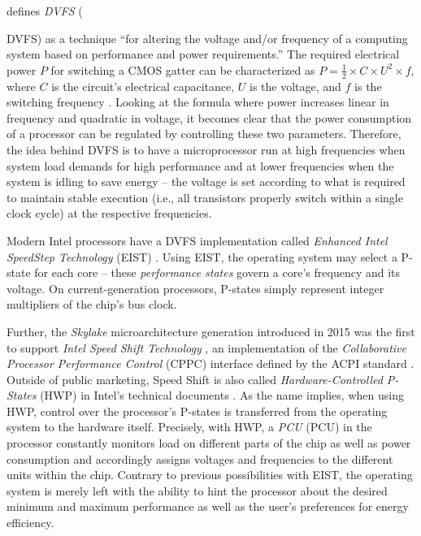 \citeauthor{mittal2014survey} \cite{mittal2014survey} defines \textit{\acrlong{DVFS}} ({\acrshort{DVFS}) as a technique \enquote{for altering the voltage and/or frequency of a computing system based on performance and power requirements.} The required electrical power $P$ for switching a \gls{CMOS} gatter can be characterized as $P=\frac{1}{2} \times C \times U^2 \times f$, where $C$ is the circuit's electrical capacitance, $U$ is the voltage, and $f$ is the switching frequency \cite{Hennessy:2017:CAS:3207796}. Looking at the formula where power increases linear in frequency and quadratic in voltage, it becomes clear that the power consumption of a processor can be regulated by controlling these two parameters. Therefore, the idea behind \gls{DVFS} is to have a microprocessor run at high frequencies when system load demands for high performance and at lower frequencies when the system is idling to save energy -- the voltage is set according to what is required to maintain stable execution (i.e., all transistors properly switch within a single clock cycle) at the respective frequencies.

Modern Intel processors have a \gls{DVFS} implementation called \emph{Enhanced Intel SpeedStep Technology} (EIST) \cite{intelsdmsysprogguide}. Using EIST, the operating system may select a \gls{P-state} for each core -- these \emph{performance states} govern a core's frequency and its voltage. On current-generation processors, \glspl{P-state} simply represent integer multipliers of the chip's bus clock.

Further, the \textit{Skylake} microarchitecture generation introduced in 2015 was the first to support \emph{Intel Speed Shift Technology} \cite{intelsykalekannouncement}, an implementation of the \emph{Collaborative Processor Performance Control} (CPPC) interface defined by the \gls{ACPI} standard \cite{acpispec}. Outside of public marketing, Speed Shift is also called \emph{Hardware-Controlled P-States} (HWP) in Intel's technical documents \cite{intelsdmsysprogguide}. As the name implies, when using HWP, control over the processor's \glspl{P-state} is transferred from the operating system to the hardware itself. Precisely, with \gls{HWP}, a \textit{\acrlong{PCU}} (\acrshort{PCU}) in the processor constantly monitors load on different parts of the chip as well as power consumption and accordingly assigns voltages and frequencies to the different units within the chip. Contrary to previous possibilities with EIST, the operating system is merely left with the ability to hint the processor about the desired minimum and maximum performance as well as the user's preferences for energy efficiency.

}
